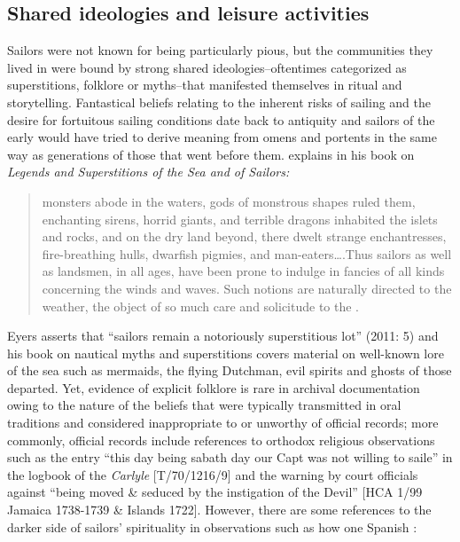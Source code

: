 \subsection{{Shared ideologies and leisure activities}}\label{sec:4.2.6}

Sailors were not known for being particularly pious, but the communities they lived in were bound by strong shared ideologies--oftentimes categorized as superstitions, folklore or myths--that manifested themselves in ritual and storytelling. Fantastical beliefs relating to the inherent risks of sailing and the desire for fortuitous sailing conditions date back to antiquity and sailors of the early  would have tried to derive meaning from omens and portents in the same way as generations of those that went before them. \citet{Bassett1885} explains in his book on \textit{Legends and Superstitions of the Sea and of Sailors:}

\begin{quotation}
monsters abode in the waters, gods of monstrous shapes ruled them, enchanting sirens, horrid giants, and terrible dragons inhabited the islets and rocks, and on the dry land beyond, there dwelt strange enchantresses, fire-breathing hulls, dwarfish pigmies, and man-eaters….Thus sailors as well as landsmen, in all ages, have been prone to indulge in fancies of all kinds concerning the winds and waves. Such notions are naturally directed to the weather, the object of so much care and solicitude to the . \citep[12]{Bassett1885}
\end{quotation}

Eyers asserts that “sailors remain a notoriously superstitious lot” (2011: 5) and his book on nautical myths and superstitions covers material on well-known lore of the sea such as mermaids, the flying Dutchman, evil spirits and ghosts of those departed. Yet, evidence of explicit folklore is rare in archival documentation owing to the nature of the beliefs that were typically transmitted in oral traditions and considered inappropriate to or unworthy of official records; more commonly, official records include references to orthodox religious observations such as the entry “this day being sabath day our Capt was not willing to saile” in the logbook of the \textit{Carlyle} [T/70/1216/9] and the warning by court officials against “being moved \& seduced by the instigation of the Devil” [HCA 1/99 Jamaica {1738}-1739 \&  Islands 1722]. However, there are some references to the darker side of sailors’ spirituality in observations such as how one Spanish : 

